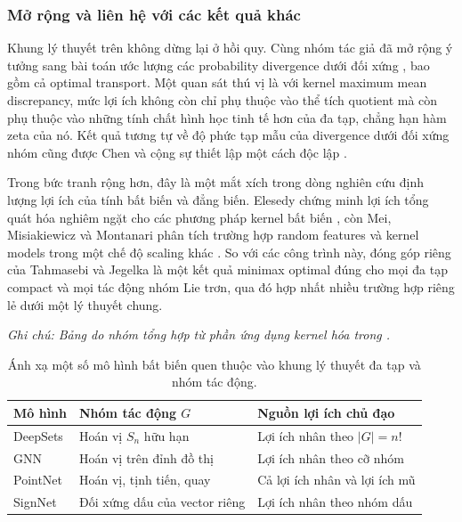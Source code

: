 \subsubsection{Mở rộng và liên hệ với các kết quả khác}
 
Khung lý thuyết trên không dừng lại ở hồi quy. Cùng nhóm tác giả đã mở rộng ý tưởng sang bài toán ước lượng các probability divergence dưới đối xứng \cite{tahmasebi2024divergences}, bao gồm cả optimal transport. Một quan sát thú vị là với kernel maximum mean discrepancy, mức lợi ích không còn chỉ phụ thuộc vào thể tích quotient mà còn phụ thuộc vào những tính chất hình học tinh tế hơn của đa tạp, chẳng hạn hàm zeta của nó. Kết quả tương tự về độ phức tạp mẫu của divergence dưới đối xứng nhóm cũng được Chen và cộng sự thiết lập một cách độc lập \cite{chen2023sample}.
 
Trong bức tranh rộng hơn, đây là một mắt xích trong dòng nghiên cứu định lượng lợi ích của tính bất biến và đẳng biến. Elesedy chứng minh lợi ích tổng quát hóa nghiêm ngặt cho các phương pháp kernel bất biến \cite{elesedy2021kernel}, còn Mei, Misiakiewicz và Montanari phân tích trường hợp random features và kernel models trong một chế độ scaling khác \cite{mei2021learning}. So với các công trình này, đóng góp riêng của Tahmasebi và Jegelka là một kết quả minimax optimal đúng cho mọi đa tạp compact và mọi tác động nhóm Lie trơn, qua đó hợp nhất nhiều trường hợp riêng lẻ dưới một lý thuyết chung.
 
\begin{table}[H]
    \centering
    \caption{Ánh xạ một số mô hình bất biến quen thuộc vào khung lý thuyết đa tạp và nhóm tác động.}
    \label{tab:applications}
    \vspace{2pt}
    \textit{Ghi chú: Bảng do nhóm tổng hợp từ phần ứng dụng kernel hóa trong \cite{tahmasebi2023exact}.}
    \vspace{4pt}
    \begin{tabular}{lll}
        \hline
        \rowcolor{gray!20}
        Mô hình & Nhóm tác động $G$ & Nguồn lợi ích chủ đạo \\
        \hline
        DeepSets & Hoán vị $S_n$ hữu hạn & Lợi ích nhân theo $|G| = n!$ \\
        GNN & Hoán vị trên đỉnh đồ thị & Lợi ích nhân theo cỡ nhóm \\
        PointNet & Hoán vị, tịnh tiến, quay & Cả lợi ích nhân và lợi ích mũ \\
        SignNet & Đối xứng dấu của vector riêng & Lợi ích nhân theo nhóm dấu \\
        \hline
    \end{tabular}
\end{table}
 
